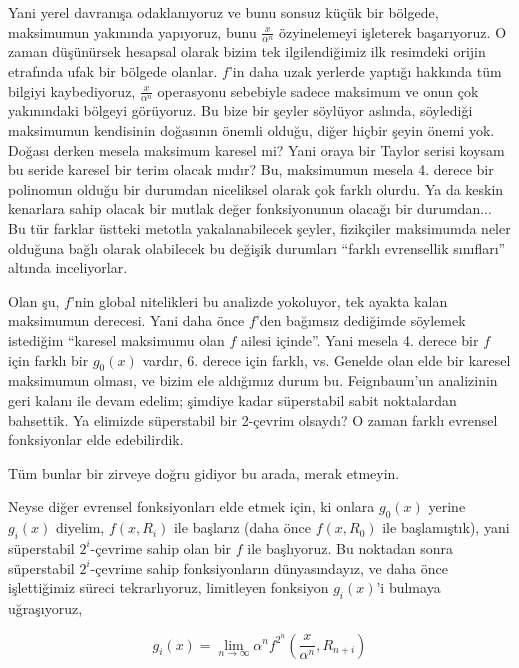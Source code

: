 \documentclass[12pt,fleqn]{article}\usepackage{../../common}
\begin{document}
Yani yerel davranışa odaklanıyoruz ve bunu sonsuz küçük bir bölgede,
maksimumun yakınında yapıyoruz, bunu $\frac{x}{\alpha^{n}}$ özyinelemeyi
işleterek başarıyoruz. O zaman düşünürsek hesapsal olarak bizim tek
ilgilendiğimiz ilk resimdeki orijin etrafında ufak bir bölgede
olanlar. $f$'in daha uzak yerlerde yaptığı hakkında tüm bilgiyi
kaybediyoruz, $\frac{x}{\alpha^{n}}$ operasyonu sebebiyle sadece maksimum
ve onun çok yakınındaki bölgeyi görüyoruz. Bu bize bir şeyler söylüyor
aslında, söylediği maksimumun kendisinin doğasının önemli olduğu, diğer
hiçbir şeyin önemi yok. Doğası derken mesela maksimum karesel mi? Yani
oraya bir Taylor serisi koysam bu seride karesel bir terim olacak mıdır?
Bu, maksimumun mesela 4. derece bir polinomun olduğu bir durumdan
niceliksel olarak çok farklı olurdu. Ya da keskin kenarlara sahip olacak
bir mutlak değer fonksiyonunun olacağı bir durumdan... Bu tür farklar
üstteki metotla yakalanabilecek şeyler, fizikçiler maksimumda neler
olduğuna bağlı olarak olabilecek bu değişik durumları ``farklı evrensellik
sınıfları'' altında inceliyorlar.

Olan şu, $f$'nin global nitelikleri bu analizde yokoluyor, tek ayakta kalan
maksimumun derecesi. Yani daha önce $f$'den bağımsız dediğimde söylemek
istediğim ``karesel maksimumu olan $f$ ailesi içinde''. Yani mesela 4. derece
bir $f$ için farklı bir $g_0(x)$ vardır, 6. derece için farklı, vs. Genelde olan
elde bir karesel maksimumun olması, ve bizim ele aldığımız durum
bu. Feignbaum'un analizinin geri kalanı ile devam edelim; şimdiye kadar
süperstabil sabit noktalardan bahsettik. Ya elimizde süperstabil bir 2-çevrim
olsaydı? O zaman farklı evrensel fonksiyonlar elde edebilirdik.

Tüm bunlar bir zirveye doğru gidiyor bu arada, merak etmeyin.

Neyse diğer evrensel fonksiyonları elde etmek için, ki onlara $g_0(x)$ yerine
$g_i(x)$ diyelim, $f(x,R_i)$ ile başlarız (daha önce $f(x,R_0)$ ile
başlamıştık), yani süperstabil $2^i$-çevrime sahip olan bir $f$ ile başlıyoruz. 
Bu noktadan sonra süperstabil $2^i$-çevrime sahip fonksiyonların
dünyasındayız, ve daha önce işlettiğimiz süreci tekrarlıyoruz, limitleyen
fonksiyon $g_i(x)$'i bulmaya uğraşıyoruz, 

$$ 
g_i(x) = \lim_{n \to \infty} \alpha^n f^{2^n} (\frac{x}{\alpha^n}, R_{n+i})
$$
\end{document}
